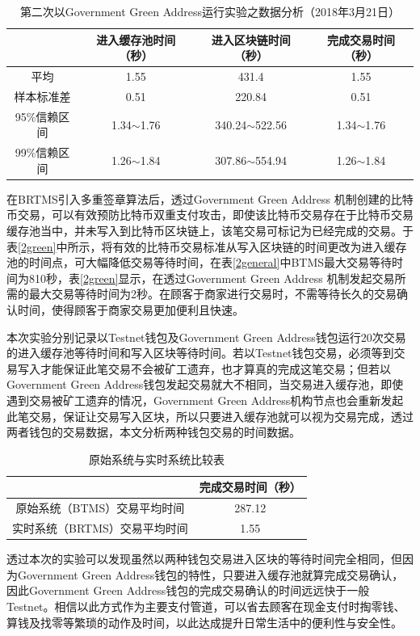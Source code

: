 			\begin{table}[!htbp]
				\centering
				\caption{第二次以Government Green Address运行实验之数据分析（2018年3月21日）}
				\label{2green-1}
				\begin{tabular}{|c|c|c|c|}
				\hline
				         & 进入缓存池时间（秒）     & 进入区块链时间（秒）         & 完成交易时间（秒）      \\ \hline
				平均       & 1.55           & 431.4              & 1.55           \\ \hline
				样本标准差    & 0.51           & 220.84             & 0.51           \\ \hline
				95\%信赖区间 & 1.34$\sim$1.76 & 340.24$\sim$522.56 & 1.34$\sim$1.76 \\ \hline
				99\%信赖区间 & 1.26$\sim$1.84 & 307.86$\sim$554.94 & 1.26$\sim$1.84 \\ \hline
				\end{tabular}
				\end{table}


			在BRTMS引入多重签章算法后，透过Government Green Address 机制创建的比特币交易，可以有效预防比特币双重支付攻击，即使该比特币交易存在于比特币交易缓存池当中，并未写入到比特币区块链上，该笔交易可标记为已经完成的交易。于表\ref{2green}中所示，将有效的比特币交易标准从写入区块链的时间更改为进入缓存池的时间点，可大幅降低交易等待时间，在表\ref{2general}中BTMS最大交易等待时间为810秒，表\ref{2green}显示，在透过Government Green Address 机制发起交易所需的最大交易等待时间为2秒。在顾客于商家进行交易时，不需等待长久的交易确认时间，使得顾客于商家交易更加便利且快速。


	本次实验分别记录以Testnet钱包及Government Green Address钱包运行20次交易的进入缓存池等待时间和写入区块等待时间。若以Testnet钱包交易，必须等到交易写入才能保证此笔交易不会被矿工遗弃，也才算真的完成这笔交易；但若以Government Green Address钱包发起交易就大不相同，当交易进入缓存池，即使遇到交易被矿工遗弃的情况，Government Green Address机构节点也会重新发起此笔交易，保证让交易写入区块，所以只要进入缓存池就可以视为交易完成，透过两者钱包的交易数据，本文分析两种钱包交易的时间数据。

	\begin{table}[!htbp]
	\centering
	\caption{原始系统与实时系统比较表}
	\label{generalvsga}
	\begin{tabular}{|c|c|}
	\hline
	 & 完成交易时间（秒） \\ \hline
	原始系统（BTMS）交易平均时间 & 287.12 \\ \hline
	实时系统（BRTMS）交易平均时间 & 1.55 \\ \hline
	\end{tabular}
	\end{table}

	透过本次的实验可以发现虽然以两种钱包交易进入区块的等待时间完全相同，但因为Government Green Address钱包的特性，只要进入缓存池就算完成交易确认，因此Government Green Address钱包的完成交易确认的时间远远快于一般Testnet。相信以此⽅式作为主要⽀付管道，可以省去顾客在现金⽀付时掏零钱、算钱及找零等繁琐的动作及时间，以此达成提升⽇常⽣活中的便利性与安全性。



		